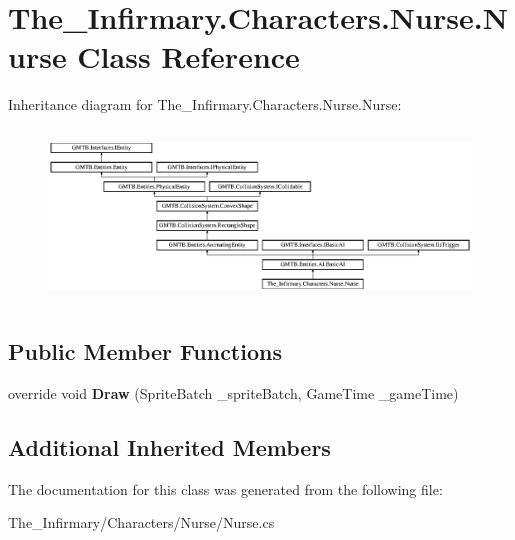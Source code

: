 \hypertarget{class_the___infirmary_1_1_characters_1_1_nurse_1_1_nurse}{}\section{The\+\_\+\+Infirmary.\+Characters.\+Nurse.\+Nurse Class Reference}
\label{class_the___infirmary_1_1_characters_1_1_nurse_1_1_nurse}
Inheritance diagram for The\+\_\+\+Infirmary.\+Characters.\+Nurse.\+Nurse\+:\begin{figure}[H]
\begin{center}
\leavevmode
\includegraphics[height=4.609054cm]{class_the___infirmary_1_1_characters_1_1_nurse_1_1_nurse}
\end{center}
\end{figure}
\subsection*{Public Member Functions}
\begin{DoxyCompactItemize}
\item 
\mbox{\label{class_the___infirmary_1_1_characters_1_1_nurse_1_1_nurse_a060855ad60cc3efcf65db5ec831a1764}} 
override void {\bfseries Draw} (Sprite\+Batch \+\_\+sprite\+Batch, Game\+Time \+\_\+game\+Time)
\end{DoxyCompactItemize}
\subsection*{Additional Inherited Members}


The documentation for this class was generated from the following file\+:\begin{DoxyCompactItemize}
\item 
The\+\_\+\+Infirmary/\+Characters/\+Nurse/Nurse.\+cs\end{DoxyCompactItemize}
